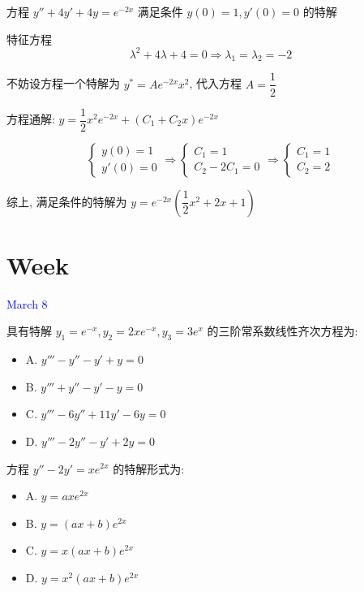 \begin{example}[][Exam: 29.1.14]
	方程 $y''+4y'+4y=e^{-2x}$ 满足条件 $y(0)=1,y'(0)=0$ 的特解
\end{example}
\begin{solution}

	特征方程
	$$\lambda^{2} + 4\lambda + 4 = 0\Rightarrow \lambda_{1} = \lambda_{2} = -2$$

	不妨设方程一个特解为 $y^{*} = Ae^{-2x}x^{2}$, 代入方程 $A = \dfrac{1}{2}$

	方程通解: $y = \dfrac{1}{2}x^{2}e^{-2x} + (C_{1} + C_{2}x)e^{-2x}$

	$$\begin{cases}
	  y(0) = 1\\
	  y'(0) = 0
	\end{cases}\Rightarrow 
	\begin{cases}
	  C_{1} = 1\\
	  C_{2} - 2C_{1} = 0
	\end{cases}\Rightarrow 
	\begin{cases}
	  C_{1} = 1\\
	  C_{2} = 2
	\end{cases}$$

	综上, 满足条件的特解为 $y = e^{-2x}(\dfrac{1}{2}x^{2} + 2x + 1)$
\end{solution}

\section{Week }
\textcolor{blue}{March 8}

\begin{example}[][Exam: 29.2.1]
	具有特解 $y_{1}=e^{-x},y_{2}=2xe^{-x},y_{3}=3e^{x}$ 的三阶常系数线性齐次方程为:
\begin{itemize}
	\item A. $y'''-y''-y'+y=0$
	\item B. $y'''+y''-y'-y=0$
	\item C. $y'''-6y''+11y'-6y=0$
	\item D. $y'''-2y''-y'+2y=0$
\end{itemize}
\end{example}
\begin{solution}

\end{solution}

\begin{example}[][Exam: 29.2.2]
	方程 $y''-2y'=xe^{2x}$ 的特解形式为:
\begin{itemize}
	\item A. $y=axe^{2x}$
	\item B. $y=(ax+b)e^{2x}$
	\item C. $y=x(ax+b)e^{2x}$
	\item D. $y=x^{2}(ax+b)e^{2x}$
\end{itemize}
\end{example}
\begin{solution}

\end{solution}

